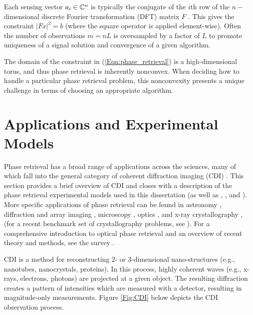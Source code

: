 Each sensing vector $a_i \in {\mathbb C}^n$ is typically the conjugate of the $i$th row of the $n-$dimensional discrete Fourier transformation (DFT) matrix $F$ \cite[Chapter 11]{bracewell1986fourier}.  This gives the constraint $|Fx|^2 = b$ (where the square operator is applied element-wise).  Often the number of observations $m = nL$ is oversampled by a factor of $L$ to promote uniqueness of a signal solution and convergence of a given algorithm.  

The domain of the constraint in (\ref{Eqn:phase_retrieval}) is a high-dimensional torus, and thus phase retrieval is inherently nonconvex.  When deciding how to handle a particular phase retrieval problem, this  nonconvexity presents a unique challenge in terms of choosing an appropriate algorithm.  






\section{Applications and Experimental Models} 			\label{Subsec:phase_retrieval-applications}


Phase retrieval has a broad range of applications across the sciences, many of which fall into the general category of coherent diffraction imaging (CDI) \cite{miao1999extending}.  
This section provides a brief overview of CDI and closes with a description of the phase retrieval experimental models used in this dissertation (as well as \cite{DBLP:journals/siamis/CandesESV13}, \cite{DBLP:journals/tit/CandesLS15}, and \cite{DBLP:journals/siamsc/FriedlanderM16}).
More specific applications of phase retrieval can be found in astronomy \cite{fienup1987phase}, diffraction and array imaging \cite{bunk2007diffractive} \cite{chai2010array}, microscopy \cite{miao2008extending}, optics \cite{walther1963question}, and x-ray crystallography \cite{harrison1993phase}, \cite{millane1990phase} (for a recent benchmark set of crystallography problems, see \cite{elser2017benchmark}).  
For a comprehensive introduction to optical phase retrieval and an overview of recent theory and methods, see the survey \cite{DBLP:journals/spm/ShechtmanECCMS15}.


CDI is a method for reconstructing $2$- or $3$-dimensional nano-structures (e.g., nanotubes, nanocrystals, proteins).  In this process, highly coherent waves (e.g., x-rays, electrons, photons) are projected at a given object.  The resulting diffraction creates a pattern of intensities which are measured with a detector, resulting in magnitude-only measurements.  Figure \ref{Fig:CDI} below depicts the CDI observation process.

